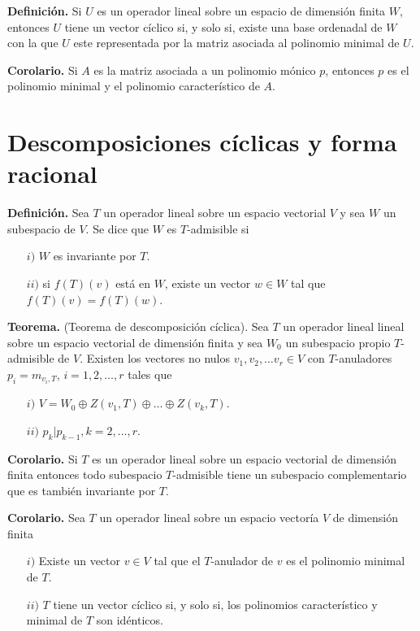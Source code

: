 \newpage

\textbf{Definición.} Si $U$ es un operador lineal sobre un
espacio de dimensión finita $W$, entonces $U$ tiene un vector
cíclico si, y solo si, existe una base ordenadal de $W$ con la
que $U$ este representada por la matriz asociada al polinomio
minimal de $U$.

\textbf{Corolario.} Si $A$ es la matriz asociada a un polinomio
mónico $p$, entonces $p$ es el polinomio minimal y el polinomio
característico de $A$.

\section{Descomposiciones cíclicas y forma racional}

\textbf{Definición.} Sea $T$ un operador lineal sobre un
espacio vectorial $V$ y sea $W$ un subespacio de $V$.
Se dice que $W$ es $T$-admisible si
\begin{itemize}
    \item[$i)$] $W$ es invariante por $T$.
    \item[$ii)$] si $f(T)(v)$ está en $W$, existe un vector
    $w\in W$ tal que $f(T)(v) = f(T)(w)$.
\end{itemize}

\textbf{Teorema.} (Teorema de descomposición cíclica).
Sea $T$ un operador lineal lineal sobre un espacio vectorial
de dimensión finita y sea $W_0$ un subespacio propio
$T$-admisible de $V$. Existen los vectores no nulos
$v_1, v_2, \dots v_r\in V$ con $T$-anuladores
$p_i=m_{v_i, T}$, $i=1,2,\dots,r$ tales que
\begin{itemize}
    \item[$i)$] $V=W_0\oplus Z(v_1, T)\oplus \dots \oplus Z(v_k, T)$.
    \item[$ii)$] $p_k|p_{k-1}, k=2,\dots,r$.
\end{itemize}

\textbf{Corolario.} Si $T$ es un operador lineal sobre
un espacio vectorial de dimensión finita entonces todo
subespacio $T$-admisible tiene un subespacio complementario
que es también invariante por $T$.

\textbf{Corolario.}
Sea $T$ un operador lineal sobre un espacio vectoría $V$ de dimensión
finita
\begin{itemize}
    \item[$i)$] Existe un vector $v\in V$ tal que el $T$-anulador
    de $v$ es el polinomio minimal de $T$.
    \item[$ii)$] $T$ tiene un vector cíclico si, y solo si, los
    polinomios característico y minimal de $T$ son idénticos.
\end{itemize}